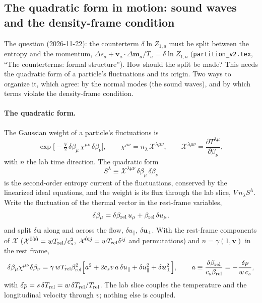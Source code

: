 \documentclass[11pt,aps,preprint,nofootinbib,superscriptaddress,tightenlines]{revtex4-2}
\def\st{\begin{equation}}
\def\stp{\end{equation}}
\let\oldparagraph\paragraph
\renewcommand{\paragraph}{\par\bigskip\oldparagraph}
\begin{document}
\subsection{The quadratic form in motion: sound waves and the density-frame condition}
\label{app:soundmodes}

The question (2026-11-22): the counterterm $\delta\ln Z_{1,a}$ must be split between the entropy and the momentum, $\Delta s_a+\bm v_a\cdot\Delta\bm m_a/T_a=\delta\ln Z_{1,a}$
(\nolinkurl{partition_v2.tex}, ``The counterterms: formal structure'').  How should the split be made?  This needs the quadratic form of a particle's fluctuations and
its origin.  Two ways to organize it, which agree: by the normal modes (the sound waves), and by which terms violate the density-frame condition.

\paragraph{The quadratic form.}  The Gaussian weight of a particle's fluctuations is
\st
\exp\Big[-\tfrac V2\,\delta\beta_\mu\,\chi^{\mu\nu}\,\delta\beta_\nu\Big],\qquad \chi^{\mu\nu}=n_\lambda\,\mathcal X^{\lambda\mu\nu},\qquad
\mathcal X^{\lambda\mu\nu}=\frac{\partial T^{\lambda\mu}}{\partial\beta_\nu},
\stp
with $n$ the lab time direction.  The quadratic form
\st
S^\lambda\equiv\mathcal X^{\lambda\mu\nu}\,\delta\beta_\mu\,\delta\beta_\nu
\stp
is the second-order entropy current of the fluctuations, conserved by the linearized ideal equations, and the weight is its flux through the lab slice, $V\,n_\lambda S^\lambda$.
Write the fluctuation of the thermal vector in the rest-frame variables,
\st
\delta\beta_\mu=\delta\beta_{\rm rel}\,u_\mu+\beta_{\rm rel}\,\delta u_\mu ,
\stp
and split $\delta\bm u$ along and across the flow, $\delta u_\parallel$, $\delta\bm u_\perp$.  With the rest-frame components of $\mathcal X$
($\mathcal X^{\hat0\hat0\hat0}=wT_{\rm rel}/c_s^2$, $\mathcal X^{\hat0\hat\imath\hat\jmath}=wT_{\rm rel}\delta^{ij}$ and permutations) and $n=\gamma(1,\bm v)$ in the rest frame,
\st
\delta\beta_\mu\chi^{\mu\nu}\delta\beta_\nu=\gamma\,wT_{\rm rel}\beta_{\rm rel}^2\Big[a^2+2c_sv\,a\,\delta u_\parallel+\delta u_\parallel^2+\delta\bm u_\perp^2\Big],\qquad
a\equiv\frac{\delta\beta_{\rm rel}}{c_s\beta_{\rm rel}}=-\frac{\delta p}{w\,c_s} ,
\stp
with $\delta p=s\,\delta T_{\rm rel}=w\,\delta T_{\rm rel}/T_{\rm rel}$.  The lab slice couples the temperature and the longitudinal velocity through $v$; nothing else is coupled.
\end{document}
